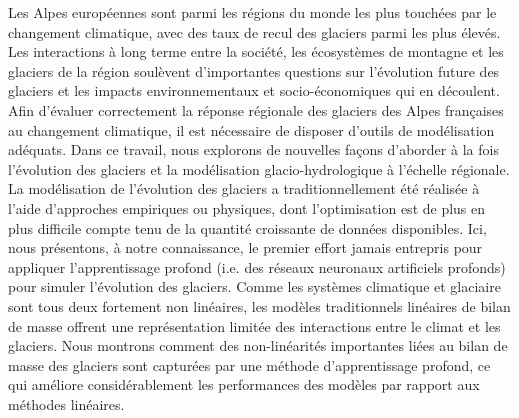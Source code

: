Les Alpes européennes sont parmi les régions du monde les plus touchées par le changement climatique, avec des taux de recul des glaciers parmi les plus élevés. Les interactions à long terme entre la société, les écosystèmes de montagne et les glaciers de la région soulèvent d'importantes questions sur l'évolution future des glaciers et les impacts environnementaux et socio-économiques qui en découlent. Afin d'évaluer correctement la réponse régionale des glaciers des Alpes françaises au changement climatique, il est nécessaire de disposer d'outils de modélisation adéquats. Dans ce travail, nous explorons de nouvelles façons d'aborder à la fois l'évolution des glaciers et la modélisation glacio-hydrologique à l'échelle régionale. La modélisation de l'évolution des glaciers a traditionnellement été réalisée à l'aide d'approches empiriques ou physiques, dont l'optimisation est de plus en plus difficile compte tenu de la quantité croissante de données disponibles. Ici, nous présentons, à notre connaissance, le premier effort jamais entrepris pour appliquer l'apprentissage profond (i.e. des réseaux neuronaux artificiels profonds) pour simuler l'évolution des glaciers. Comme les systèmes climatique et glaciaire sont tous deux fortement non linéaires, les modèles traditionnels linéaires de bilan de masse offrent une représentation limitée des interactions entre le climat et les glaciers. Nous montrons comment des non-linéarités importantes liées au bilan de masse des glaciers sont capturées par une méthode d'apprentissage profond, ce qui améliore considérablement les performances des modèles par rapport aux méthodes linéaires. 


